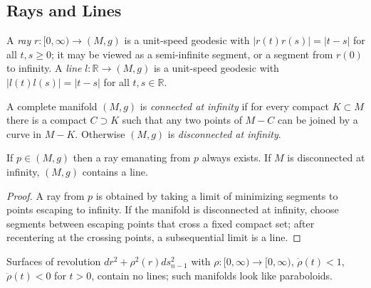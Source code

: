 \subsection{Rays and Lines}

\begin{definition}
  \label{def:pet-ch7-ray-line}
  A \emph{ray} $r:[0,\infty)\to(M,g)$ is a unit-speed geodesic with
  $|r(t)r(s)|=|t-s|$ for all $t,s\ge0$; it may be viewed as a semi-infinite
  segment, or a segment from $r(0)$ to infinity. A \emph{line}
  $l:\mathbb{R}\to(M,g)$ is a unit-speed geodesic with $|l(t)l(s)|=|t-s|$ for all
  $t,s\in\mathbb{R}$.
\end{definition}

\begin{definition}
  \label{def:pet-ch7-connected-infinity}
  A complete manifold $(M,g)$ is \emph{connected at infinity} if for every
  compact $K\subset M$ there is a compact $C\supset K$ such that any two
  points of $M-C$ can be joined by a curve in $M-K$. Otherwise $(M,g)$ is
  \emph{disconnected at infinity}.
\end{definition}

\begin{lemma}
  \label{lem:pet-ch7-ray-line-existence}
  If $p\in(M,g)$ then a ray emanating from $p$ always exists. If $M$ is
  disconnected at infinity, $(M,g)$ contains a line.
\end{lemma}
\begin{proof}
  \sketch
  A ray from \(p\) is obtained by taking a limit of minimizing segments to points escaping to infinity. If the manifold is disconnected at infinity, choose segments between escaping points that cross a fixed compact set; after recentering at the crossing points, a subsequential limit is a line.
\end{proof}

\begin{example}
  \label{ex:pet-ch7-paraboloid-no-lines}
  Surfaces of revolution $dr^2+\rho^2(r)ds^2_{n-1}$ with $\rho:[0,\infty)\to
  [0,\infty)$, $\dot\rho(t)<1$, $\ddot\rho(t)<0$ for $t>0$, contain no lines;
  such manifolds look like paraboloids.
\end{example}

